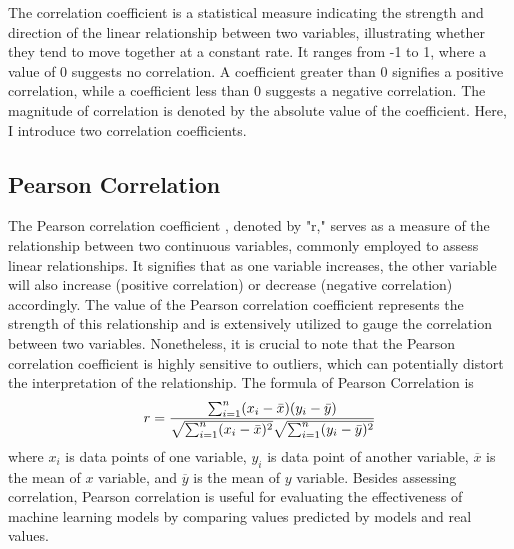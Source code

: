 \documentclass[12pt,a4paper,english
]{tunithesis}
\begin{document}
The correlation coefficient is a statistical measure indicating the strength and direction of the linear relationship between two variables, illustrating whether they tend to move together at a constant rate. It ranges from -1 to 1, where a value of 0 suggests no correlation. A coefficient greater than 0 signifies a positive correlation, while a coefficient less than 0 suggests a negative correlation. The magnitude of correlation is denoted by the absolute value of the coefficient. Here, I introduce two correlation coefficients. \parencite{acuk2023, Schober2018}

\subsection{Pearson Correlation}
The Pearson correlation coefficient \parencite{acuk2023, Schober2018}, denoted by "r," serves as a measure of the relationship between two continuous variables, commonly employed to assess linear relationships. It signifies that as one variable increases, the other variable will also increase (positive correlation) or decrease (negative correlation) accordingly. The value of the Pearson correlation coefficient represents the strength of this relationship and is extensively utilized to gauge the correlation between two variables. Nonetheless, it is crucial to note that the Pearson correlation coefficient is highly sensitive to outliers, which can potentially distort the interpretation of the relationship. The formula of Pearson Correlation is
\begin{equation}
  r =
  \frac{ \sum_{i=1}^{n}(x_i-\bar{x})(y_i-\bar{y}) }{%
        \sqrt{\sum_{i=1}^{n}(x_i-\bar{x})^2}\sqrt{\sum_{i=1}^{n}(y_i-\bar{y})^2}}
\end{equation}
where $x_i$ is data points of one variable, $y_i$ is data point of another variable, $\overline{x}$ is the mean of $x$ variable, and $\overline{y}$ is the mean of $y$ variable. Besides assessing correlation, Pearson correlation is useful for evaluating the effectiveness of machine learning models by comparing values predicted by models and real values. \parencite{kirk2021} 
\end{document}
